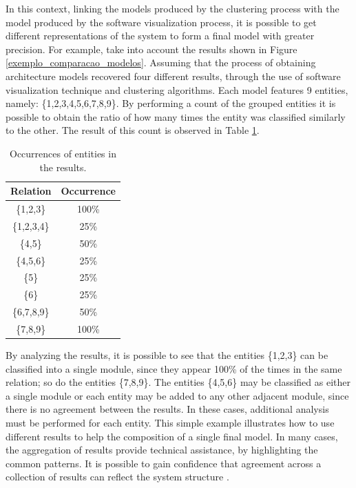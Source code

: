 \documentclass{sig-alternate-05-2015}
\begin{document}
In this context, linking the models produced by the clustering process with the model produced by the software visualization process, it is possible to get different representations of the system to form a final model with greater precision. For example, take into account the results shown in Figure \ref{exemplo_comparacao_modelos}. Assuming that the process of obtaining architecture models recovered four different results, through the use of software visualization technique and clustering algorithms. Each model features 9 entities, namely: \{1,2,3,4,5,6,7,8,9\}. By performing a count of the grouped entities it is  possible to obtain the ratio of how many times the entity was classified similarly to the other. The result of this count is observed in Table \ref{ocorrencias_1}.

\begin{table}[]
	\centering
	\caption{Occurrences of entities in the results.}
	\label{ocorrencias_1}
	\begin{tabular}{|cc|}
		\hline
		\multicolumn{1}{|l}{Relation} & \multicolumn{1}{l|}{Occurrence} \\ \hline
		\{1,2,3\}                   & 100\%                           \\
		\{1,2,3,4\}                 & 25\%                            \\
		\{4,5\}                     & 50\%                            \\
		\{4,5,6\}                   & 25\%                            \\
		\{5\}                       & 25\%                            \\
		\{6\}                       & 25\%                            \\
		\{6,7,8,9\}                 & 50\%                            \\
		\{7,8,9\}                   & 100\%                           \\ \hline
	\end{tabular}
\end{table}

By analyzing the results, it is possible to see that the entities \{1,2,3\} can be classified into a single module, since they appear 100\% of the times in the same relation; so do the entities \{7,8,9\}. The entities \{4,5,6\} may be classified as either a single module or each entity may be added to any other adjacent module, since there is no agreement between the results. In these cases, additional analysis must be performed for each entity. This simple example illustrates how to use different results to help the composition of a single final model. In many cases, the aggregation of results provide technical assistance, by highlighting the common patterns. It is possible to gain confidence that agreement across a collection of results can reflect the system structure \cite {craft}.
\end{document}
